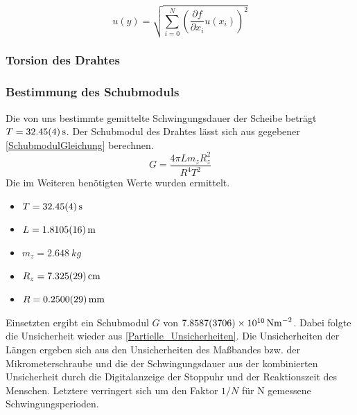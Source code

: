 \documentclass[
	a4paper,
	12pt,
	pagesize,
	ngerman
]{scrartcl}
\begin{document}
	\begin{equation}
	u(y) = \sqrt{  \sum_{i=0}^{N} \left( \frac{\partial f}{\partial x_i}u(x_i)\right)^2  }
	\label{Partielle_Unsicherheiten}
	\end{equation}
	
	\subsubsection{Torsion des Drahtes}
	\subsubsection*{Bestimmung des Schubmoduls}
	Die von uns bestimmte gemittelte Schwingungsdauer der Scheibe beträgt $T=\SI{32,45 \pm 0,04}{s}$.
	Der Schubmodul des Drahtes lässt sich aus gegebener \cref{SchubmodulGleichung} berechnen.
	\begin{equation}
		\label{SchubmodulGleichung}
		G = \frac{4\pi Lm_zR_z^2}{R^4T^2}
	\end{equation}
	Die im Weiteren benötigten Werte wurden ermittelt. 
	\begin{itemize}
		\item $T=\SI{32,45 \pm 0,04}{s}$
		\item $L = \SI{1,8105 \pm 0,0016 }{m}$
		\item $m_z = \SI{2,648}{kg}$
		\item $R_z = \SI{7,325 \pm 0,029}{cm}$
		\item $R = \SI{0,25 \pm 0,0029}{mm}$
	\end{itemize}
	Einsetzten ergibt ein Schubmodul $G$ von $\SI{7,8587\pm 0,3706e10}{Nm^{-2}}$. Dabei folgte die Unsicherheit wieder aus \cref{Partielle_Unsicherheiten}.
	Die Unsicherheiten der Längen ergeben sich aus den Unsicherheiten des Maßbandes bzw. der Mikrometerschraube und die der Schwingungsdauer aus der kombinierten Unsicherheit durch die Digitalanzeige der Stoppuhr und der Reaktionszeit des Menschen. Letztere verringert sich um den Faktor $1/N $ für N gemessene Schwingungsperioden.
\end{document}

